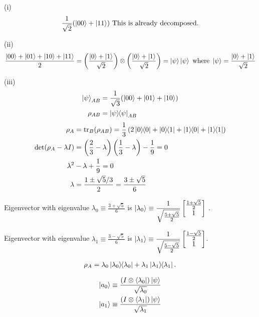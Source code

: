(i)
\begin{align*}
	\frac{1}{\sqrt{2}} (\ket{00} + \ket{11}) \text{ This is already decomposed.}
\end{align*}


(ii)
\begin{align*}
	\frac{\ket{00}+ \ket{01} + \ket{10} + \ket{11}}{2} = \left( \frac{\ket{0} + \ket{1}}{\sqrt{2}}  \right) \otimes \left( \frac{\ket{0} + \ket{1}}{\sqrt{2}}  \right) = \ket{\psi} \ket{\psi} \text{ where } \ket{\psi} = \frac{\ket{0} + \ket{1}}{\sqrt{2}}
\end{align*}



(iii)
\begin{align*}
	\ket{\psi}_{AB} &= \frac{1}{\sqrt{3}} (\ket{00} + \ket{01} + \ket{10})\\
	\rho_{AB} &= \ket{\psi}\hspace{-1mm} \bra{\psi}_{AB}
\end{align*}
%
%
%
\begin{align*}
	\rho_A &= \operatorname{tr}_B (\rho_{AB}) = \frac{1}{3} \left( 2\ket{0}\hspace{-1mm} \bra{0} + \ket{0}\hspace{-1mm} \bra{1} + \ket{1}\hspace{-1mm} \bra{0} + \ket{1}\hspace{-1mm} \bra{1} \right)\\
	\det (\rho_A - \lambda I) &= \left( \frac{2}{3} - \lambda \right) \left( \frac{1}{3} - \lambda \right) - \frac{1}{9} = 0\\
	\lambda^2 &- \lambda + \frac{1}{9} = 0\\
	\lambda &= \frac{1 \pm \sqrt{5} / 3}{2} = \frac{3 \pm \sqrt{5}}{6}
\end{align*}



Eigenvector with eigenvalue $\displaystyle \lambda_0 \equiv \frac{3 + \sqrt{5}}{6}$ is $\displaystyle \ket{\lambda_0} \equiv \frac{1}{\sqrt{\frac{5 + \sqrt{5}}{2}}} \begin{bmatrix}
    \frac{1 + \sqrt{5}}{2} \\
    1
\end{bmatrix}$ .

Eigenvector with eigenvalue $\displaystyle \lambda_1 \equiv \frac{3 - \sqrt{5}}{6}$ is $\displaystyle \ket{\lambda_1} \equiv \frac{1}{\sqrt{\frac{5 - \sqrt{5}}{2}}} \begin{bmatrix}
    \frac{1 - \sqrt{5}}{2} \\
    1
\end{bmatrix} $.

\begin{align*}
	\rho_A = \lambda_0 \ket{\lambda_0}\hspace{-1mm} \bra{\lambda_0} + \lambda_1 \ket{\lambda_1}\hspace{-1mm} \bra{\lambda_1}.
\end{align*}


\begin{align*}
	\ket{a_0} \equiv \frac{(I \otimes \bra{\lambda_0}) \ket{\psi} }{\sqrt{\lambda_0}}\\
	\ket{a_1} \equiv \frac{(I \otimes \bra{\lambda_1}) \ket{\psi} }{\sqrt{\lambda_1}}
\end{align*}

